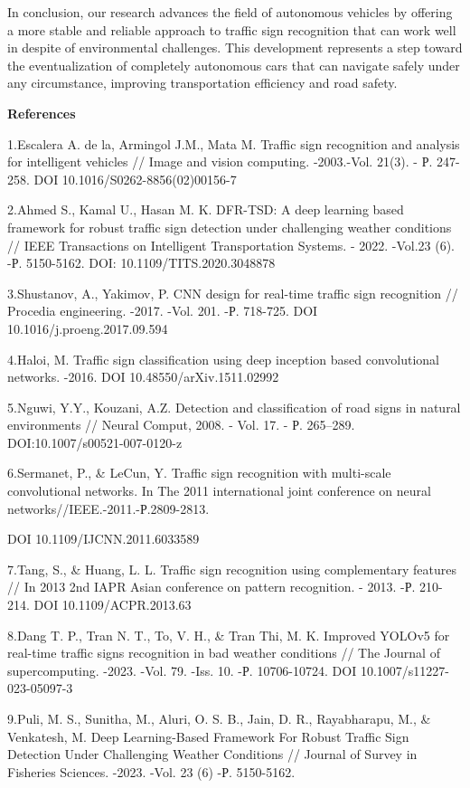 In conclusion, our research advances the field of autonomous vehicles by
offering a more stable and reliable approach to traffic sign recognition
that can work well in despite of environmental challenges. This
development represents a step toward the eventualization of completely
autonomous cars that can navigate safely under any circumstance,
improving transportation efficiency and road safety.

\textbf{References}

1.Escalera A. de la, Armingol J.M., Mata M. Traffic sign recognition and
analysis for intelligent vehicles // Image and vision computing.
-2003.-Vol. 21(3). - Р. 247-258. DOI 10.1016/S0262-8856(02)00156-7

2.Ahmed S., Kamal U., Hasan M. K. DFR-TSD: A deep learning based
framework for robust traffic sign detection under challenging weather
conditions // IEEE Transactions on Intelligent Transportation Systems. -
2022. -Vol.23 (6). -Р. 5150-5162. DOI: 10.1109/TITS.2020.3048878

3.Shustanov, A., Yakimov, P. CNN design for real-time traffic sign
recognition // Procedia engineering. -2017. -Vol. 201. -Р. 718-725. DOI
10.1016/j.proeng.2017.09.594

4.Haloi, M. Traffic sign classification using deep inception based
convolutional networks. -2016. DOI 10.48550/arXiv.1511.02992

5.Nguwi, Y.Y., Kouzani, A.Z. Detection and classification of road signs
in natural environments // Neural Comput, 2008. - Vol. 17. - Р.
265--289. DOI:10.1007/s00521-007-0120-z

6.Sermanet, P., \& LeCun, Y. Traffic sign recognition with multi-scale
convolutional networks. In The 2011 international joint conference on
neural networks//IEEE.-2011.-Р.2809-2813.

DOI 10.1109/IJCNN.2011.6033589

7.Tang, S., \& Huang, L. L. Traffic sign recognition using complementary
features // In 2013 2nd IAPR Asian conference on pattern recognition. -
2013. -Р. 210-214. DOI 10.1109/ACPR.2013.63

8.Dang T. P., Tran N. T., To, V. H., \& Tran Thi, M. K. Improved YOLOv5
for real-time traffic signs recognition in bad weather conditions // The
Journal of supercomputing. -2023. -Vol. 79. -Iss. 10. -Р. 10706-10724.
DOI 10.1007/s11227-023-05097-3

9.Puli, M. S., Sunitha, M., Aluri, O. S. B., Jain, D. R., Rayabharapu,
M., \& Venkatesh, M. Deep Learning-Based Framework For Robust Traffic
Sign Detection Under Challenging Weather Conditions // Journal of Survey
in Fisheries Sciences. -2023. -Vol. 23 (6) -Р. 5150-5162.

